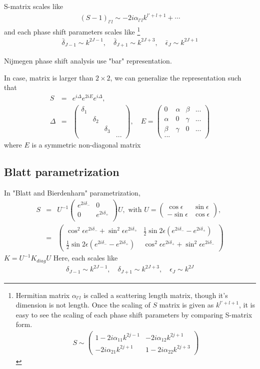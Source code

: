 \documentclass[10pt]{article}
\newcommand{\bea}{\begin{eqnarray}}
\newcommand{\eea}{\end{eqnarray}}
\newcommand{\no}{\nonumber \\}
\begin{document}
S-matrix scales like
\bea
(S-1)_{l'l}\sim -2i\alpha_{l'l} k^{l'+l+1}+\cdots
\eea
and each phase shift parameters scales like
\footnote{
Hermitian matrix $\alpha_{l'l}$ is called a scattering length matrix,
though it's dimension is not length. 
Once the scaling of $S$ matrix is given as $k^{l'+l+1}$,
it is easy to see the scaling of each phase shift parameters
by comparing S-matrix form.
\bea
S\sim\left( \begin{array}{cc}
1-2i\alpha_{11}k^{2j-1} & -2i\alpha_{12} k^{2j+1}\\
-2i\alpha_{21}k^{2j+1} & 1-2i\alpha_{22} k^{2j+3}
\end{array}
\right)
\eea
} 
\bea
\bar{\delta}_{J-1}\sim k^{2J-1},\quad
\bar{\delta}_{J+1}\sim k^{2J+3},\quad
\bar{\epsilon}_J\sim k^{2J+1}
\eea

Nijmegen phase shift analysis use "bar" representation.

In case, matrix is larger than $2\times 2$, we can generalize the
representation such that
\bea
S&=&e^{i \Delta}e^{2i E} e^{i\Delta},\no
\Delta&=&\left(\begin{array}{cccc} \delta_1 &  &  &  \\
                                     &\delta_2 & &\\
                                     &  & \delta_3 & \\
                                     &  &  & ...   
\end{array}
\right),\quad
E=\left(\begin{array}{cccc} 
  0 & \alpha & \beta & ... \\
  \alpha & 0 & \gamma & ...\\
  \beta & \gamma & 0 & ... \\
  ... &  &  &  
  \end{array}
\right)
\eea
where $E$ is a symmetric non-diagonal matrix

\subsection{Blatt parametrization}
In "Blatt and Bierdenharn" parametrization,
\bea
S&=&U^{-1}\left(\begin{array}{cc}
   e^{2i\delta_-} & 0 \\ 0 & e^{2i\delta_+}\\
\end{array}\right)U, \mbox{ with }
 U=\left(\begin{array}{cc}
    \cos\epsilon &\sin\epsilon \\ -\sin\epsilon & \cos\epsilon
 \end{array}\right),\no
 &=&\left(\begin{array}{cc}
  \cos^2\epsilon e^{2i\delta_{-}} +\sin^2\epsilon e^{2i\delta_{+}} &
  \frac{1}{2}\sin2\epsilon (e^{2i\delta_-}-e^{2i\delta_+}) \\
  \frac{1}{2}\sin2\epsilon (e^{2i\delta_-}-e^{2i\delta_+}) &
  \cos^2\epsilon e^{2i\delta_{+}} +\sin^2\epsilon e^{2i\delta_{-}}
 \end{array}\right)
\eea
$K=U^{-1}K_{diag} U$
Here, each scales like 
\bea
{\delta}_{J-1}\sim k^{2J-1},\quad
{\delta}_{J+1}\sim k^{2J+3},\quad
{\epsilon}_J\sim k^{2J}
\eea
\end{document}
